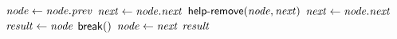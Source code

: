 \begin{algorithm*}[!ht]
\begin{algorithmic}[1]
\begin{multicols}{2}
{{			 \label{lfline:get-while2s}
				 $\ms{node} \gets \ms{node.prev}$ \label{lfline:get-while1f}\label{lfline:get-while1s}\label{lfline:val-rem} 
				\EndWhile 
				\State $\ms{next} \gets \ms{node.next}$ \label{lfline:val-next} 
				 \label{lfline:get-helpcheck}  
					\State $\lit{help-remove}(\ms{node, next})$  \label{lfline:get-help}
					\State $\ms{next} \gets \ms{node.next}$
				\EndIf
				 \label{lfline:get-node} \label{lfline:val-check}
					\State $\ms{result} \gets \ms{node}$
					\State $\lit{break}()$
				\EndIf
				\State $\ms{node} \gets \ms{next}$ \label{lfline:get-while2f}
			\EndWhile
			\Return $\ms{result}$ \EndReturn
		}\EndPart



   	

				


	}
    \end{multicols}
    
  \end{algorithmic}
\end{algorithm*}
